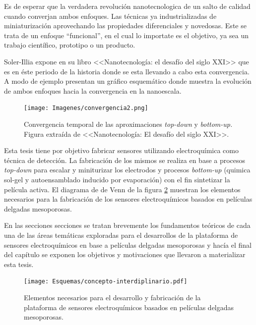 		Es de esperar que la verdadera revolución nanotecnologica de un salto de calidad cuando converjan ambos enfoques. Las técnicas ya industrializadas de miniaturización aprovechando las propiedades diferenciales y novedosas. Este se trata de un enfoque ``funcional'', en el cual lo importate es el objetivo, ya sea un trabajo científico, prototipo o un producto.

		Soler-Illia expone en su libro <<Nanotecnología: el desafío del siglo XXI>>\cite{nanotecnologia-galo} que es en éste periodo de la historia donde se esta llevando a cabo esta convergencia. A modo de ejemplo presentan un gráfico esquemático donde muestra la evolución de ambos enfoques hacia la convergencia en la nanoescala.

			\begin{figure}[ht!]
 				\begin{center}
 				\texttt{[image: Imagenes/convergencia2.png]}
 				\caption[Convergencia \textit{top-down }y \textit{bottom-up.}]{Convergencia temporal de las aproximaciones \textit{top-down }y \textit{bottom-up.} Figura extraída de <<Nanotecnología: El desafío del siglo XXI>>.}
 				\label{fig:galo-convergencia}
 		   	    \end{center}
 		   	    \end{figure}

    	Esta tesis tiene por objetivo fabricar sensores utilizando electroquímica como técnica de detección. La fabricación de los mismos se realiza en base a procesos \textit{top-down} para escalar y miniturizar los electrodos y procesos \textit{bottom-up} (quimica sol-gel y autoensamblado inducido por evaporación) con el fin sintetizar la película activa. El diagrama de  de Venn de la figura \ref{fig:sensores} muestran los elementos necesarios para la fabricación de los sensores electroquímicos basados en películas delgadas mesoporosas. 
	 	
 		En las secciones secciones se tratan brevemente los fundamentos teóricos de cada una de las áreas temáticas exploradas para el desarrollos de la plataforma de sensores electroquímicos en base a películas delgadas mesoporosas y hacía el final del capítulo se exponen los objetivos y motivaciones que llevaron a materializar esta tesis.


	       \begin{figure}[ht!]
 				\begin{center}
 				\texttt{[image: Esquemas/concepto-interdiplinario.pdf]}
 				\caption[Plataforma de sensores. Diagrama de Venn.]{Elementos necesarios para el desarrollo y fabricación de la plataforma de sensores electroquímicos basados en películas delgadas mesoporosas.}
 		   		\label{fig:sensores}
 		    	\end{center}
 		    	\end{figure}
